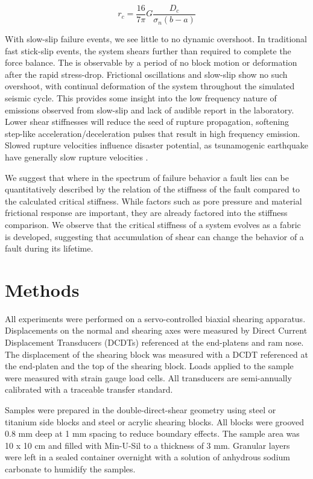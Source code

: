 \documentclass[11pt]{article}
\begin{document}
\begin{equation}
    r_c = \frac{16}{7\pi}G \frac{D_c}{\sigma_n (b-a)}
    \label{equation:rc}
\end{equation}

With slow-slip failure events, we see little to no dynamic overshoot. In
traditional fast stick-slip events, the system shears further than required to
complete the force balance. The is observable by a period of no block motion or
deformation after the rapid stress-drop.  Frictional oscillations and slow-slip
show no such overshoot, with continual deformation of the system throughout the
simulated seismic cycle. This provides some insight into the low frequency
nature of emissions observed from slow-slip and lack of audible report in the
laboratory. Lower shear stiffnesses will reduce the seed of rupture propagation,
softening step-like acceleration/deceleration pulses that result in high
frequency emission. Slowed rupture velocities influence disaster potential, as
tsunamogenic earthquake have generally slow rupture velocities
\cite{Kanamori:1993, Bilek:1999}.

We suggest that where in the spectrum of failure behavior a fault lies can be
quantitatively described by the relation of the stiffness of the fault compared
to the calculated critical stiffness. While factors such as pore pressure and
material frictional response are important, they are already factored into  the
stiffness comparison. We observe that the critical stiffness of a system evolves
as a fabric is developed, suggesting that accumulation of shear can change the
behavior of a fault during its lifetime.

\section{Methods}
All experiments were performed on a servo-controlled biaxial shearing apparatus.
Displacements on the normal and shearing axes were measured by Direct Current
Displacement Transducers (DCDTs) referenced at the end-platens and ram nose. The
displacement of the shearing block was measured with a DCDT referenced at the
end-platen and the top of the shearing block. Loads applied to the sample were
measured with strain gauge load cells. All transducers are semi-annually
calibrated with a traceable transfer standard.

Samples were prepared in the double-direct-shear geometry using steel or
titanium side blocks and steel or acrylic shearing blocks. All blocks were
grooved 0.8 mm deep at 1 mm spacing to reduce boundary effects. The sample area
was 10 x 10 cm and filled with Min-U-Sil to a thickness of 3 mm. Granular layers
were left in a sealed container overnight with a solution of anhydrous sodium
carbonate to humidify the samples.
\end{document}

